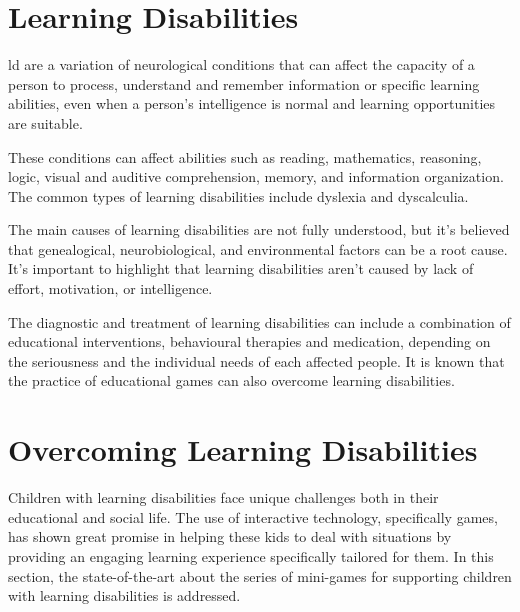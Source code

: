 \section{Learning Disabilities}
\label{section:learningdisabilityexplanation}
\gls{ld} are a variation of neurological conditions that can affect the capacity of a person to process, understand and remember information or specific learning abilities, even when a person’s intelligence is normal and learning opportunities are suitable.


These conditions can affect abilities such as reading, mathematics, reasoning, logic, visual and auditive comprehension, memory, and information organization. The common types of learning disabilities include dyslexia and dyscalculia.%

The main causes of learning disabilities are not fully understood, but it’s believed that genealogical, neurobiological, and environmental factors can be a root cause. It’s important to highlight that learning disabilities aren’t caused by lack of effort, motivation, or intelligence. 

The diagnostic and treatment of learning disabilities can include a combination of educational interventions, behavioural therapies and medication, depending on the seriousness and the individual needs of each affected people. It is known that the practice of educational games can also overcome learning disabilities.

\newpage
\section{Overcoming Learning Disabilities}
\label{sec:overcomingLds}

Children with learning disabilities face unique challenges both in their educational and social life. The use of interactive technology, specifically games, has shown great promise in helping these kids to deal with situations by providing an engaging learning experience specifically tailored for them. In this section, the state-of-the-art about the series of mini-games for supporting children with learning disabilities is addressed.

